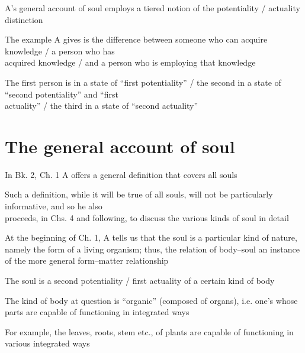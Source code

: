 \documentclass[11pt]{article}
\begin{document}
\noindent A's general account of soul employs a tiered notion of the potentiality / actuality distinction
\vspace*{2mm}

The example A gives is the difference between someone who can acquire knowledge / a person who has\\\hspace*{6mm}acquired knowledge / and a person who is employing that knowledge
\vspace*{2mm}

The first person is in a state of ``first potentiality'' / the second in a state of ``second potentiality'' and ``first\\\hspace*{6mm}actuality'' / the third in a state of ``second actuality''
\vspace*{-1mm}

\section*{The general account of soul}

\noindent In Bk. 2, Ch. 1 A offers a general definition that covers all souls
\vspace*{2mm}

Such a definition, while it will be true of all souls, will not be particularly informative, and so he also\\\hspace*{6mm}proceeds, in Chs. 4 and following, to discuss the various kinds of soul in detail 
\vspace*{2mm}

\noindent At the beginning of Ch. 1, A tells us that the soul is a particular kind of nature, namely the form of a living organism; thus, the relation of body--soul an instance of the more general form--matter relationship
\vspace*{2mm}

\noindent The soul is a second potentiality / first actuality of a certain kind of body
\vspace*{2mm}

\noindent The kind of body at question is ``organic'' (composed of organs), i.e. one's whose parts are capable of functioning in integrated ways
\vspace*{2mm}

For example, the leaves, roots, stem etc., of plants are capable of functioning in various integrated ways
\vspace*{2mm}
\end{document}
